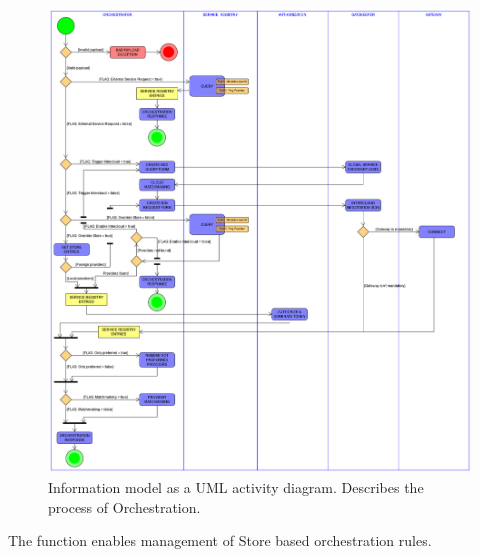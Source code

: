 \documentclass[a4paper]{arrowhead}
\begin{document}
\begin{figure}
  \centering
  \includegraphics[width=\textwidth,height=\textheight,keepaspectratio]{figures/post_orchestration_activity_uml.png}
  \caption{
    Information model as a UML activity diagram. Describes the process of Orchestration.
  }
  \label{fig:query_overview}
\end{figure}


The function enables management of Store based orchestration rules.
\end{document}
